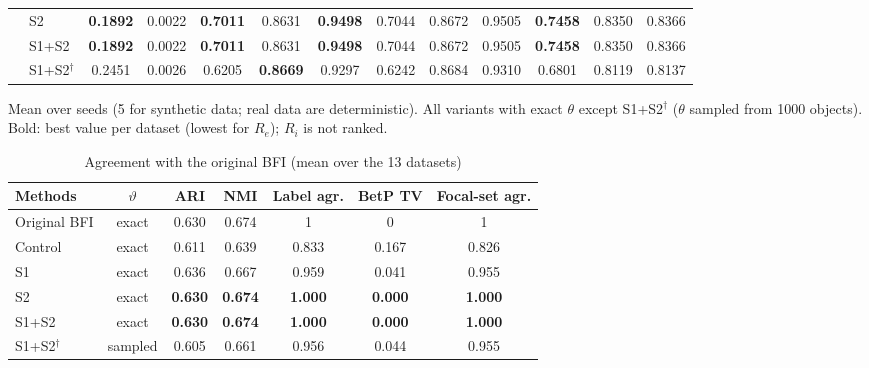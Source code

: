 \documentclass[journal]{IEEEtran}
\begin{document}
\begin{table}[!t]
\begin{tabular}{llccccccccccc}
 & S2 & \textbf{0.1892} & 0.0022 & \textbf{0.7011} & 0.8631 & \textbf{0.9498} & 0.7044 & 0.8672 & 0.9505 & \textbf{0.7458} & 0.8350 & 0.8366 \\
 & S1+S2 & \textbf{0.1892} & 0.0022 & \textbf{0.7011} & 0.8631 & \textbf{0.9498} & 0.7044 & 0.8672 & 0.9505 & \textbf{0.7458} & 0.8350 & 0.8366 \\
 & S1+S2$^{\dagger}$ & 0.2451 & 0.0026 & 0.6205 & \textbf{0.8669} & 0.9297 & 0.6242 & 0.8684 & 0.9310 & 0.6801 & 0.8119 & 0.8137 \\
\bottomrule
\end{tabular}
\vspace{2pt}
\parbox{\textwidth}{\footnotesize Mean over seeds (5 for synthetic data; real data are deterministic). All variants with exact $\theta$ except S1+S2$^{\dagger}$ ($\theta$ sampled from 1000 objects). Bold: best value per dataset (lowest for $R_e$); $R_i$ is not ranked.}
\end{table}

\begin{table}[!t]
\centering
\caption{Agreement with the original BFI (mean over the 13 datasets)}
\label{tab:agree}
\scriptsize
\setlength{\tabcolsep}{3pt}
\begin{tabular}{lcccccc}
\toprule
Methods & $\vartheta$ & ARI & NMI & Label agr. & BetP TV & Focal-set agr. \\
\midrule
Original BFI & exact & 0.630 & 0.674 & 1 & 0 & 1 \\
Control & exact & 0.611 & 0.639 & 0.833 & 0.167 & 0.826 \\
S1 & exact & 0.636 & 0.667 & 0.959 & 0.041 & 0.955 \\
S2 & exact & \textbf{0.630} & \textbf{0.674} & \textbf{1.000} & \textbf{0.000} & \textbf{1.000} \\
S1+S2 & exact & \textbf{0.630} & \textbf{0.674} & \textbf{1.000} & \textbf{0.000} & \textbf{1.000} \\
S1+S2$^{\dagger}$ & sampled & 0.605 & 0.661 & 0.956 & 0.044 & 0.955 \\
\bottomrule
\end{tabular}
\end{table}
\end{document}
